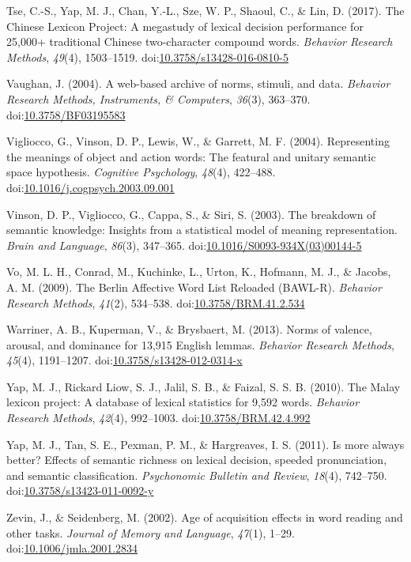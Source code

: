 \documentclass[english,man]{apa6}
\theoremstyle{definition}
\theoremstyle{definition}
\theoremstyle{definition}
\theoremstyle{remark}
\begin{document}
\hypertarget{ref-Tse2017}{}
Tse, C.-S., Yap, M. J., Chan, Y.-L., Sze, W. P., Shaoul, C., \& Lin, D.
(2017). The Chinese Lexicon Project: A megastudy of lexical decision
performance for 25,000+ traditional Chinese two-character compound
words. \emph{Behavior Research Methods}, \emph{49}(4), 1503--1519.
doi:\href{https://doi.org/10.3758/s13428-016-0810-5}{10.3758/s13428-016-0810-5}

\hypertarget{ref-Vaughan2004}{}
Vaughan, J. (2004). A web-based archive of norms, stimuli, and data.
\emph{Behavior Research Methods, Instruments, \& Computers},
\emph{36}(3), 363--370.
doi:\href{https://doi.org/10.3758/BF03195583}{10.3758/BF03195583}

\hypertarget{ref-Vigliocco2004}{}
Vigliocco, G., Vinson, D. P., Lewis, W., \& Garrett, M. F. (2004).
Representing the meanings of object and action words: The featural and
unitary semantic space hypothesis. \emph{Cognitive Psychology},
\emph{48}(4), 422--488.
doi:\href{https://doi.org/10.1016/j.cogpsych.2003.09.001}{10.1016/j.cogpsych.2003.09.001}

\hypertarget{ref-Vinson2003}{}
Vinson, D. P., Vigliocco, G., Cappa, S., \& Siri, S. (2003). The
breakdown of semantic knowledge: Insights from a statistical model of
meaning representation. \emph{Brain and Language}, \emph{86}(3),
347--365.
doi:\href{https://doi.org/10.1016/S0093-934X(03)00144-5}{10.1016/S0093-934X(03)00144-5}

\hypertarget{ref-Vo2009}{}
Vo, M. L. H., Conrad, M., Kuchinke, L., Urton, K., Hofmann, M. J., \&
Jacobs, A. M. (2009). The Berlin Affective Word List Reloaded (BAWL-R).
\emph{Behavior Research Methods}, \emph{41}(2), 534--538.
doi:\href{https://doi.org/10.3758/BRM.41.2.534}{10.3758/BRM.41.2.534}

\hypertarget{ref-Warriner2013}{}
Warriner, A. B., Kuperman, V., \& Brysbaert, M. (2013). Norms of
valence, arousal, and dominance for 13,915 English lemmas.
\emph{Behavior Research Methods}, \emph{45}(4), 1191--1207.
doi:\href{https://doi.org/10.3758/s13428-012-0314-x}{10.3758/s13428-012-0314-x}

\hypertarget{ref-Yap2010}{}
Yap, M. J., Rickard Liow, S. J., Jalil, S. B., \& Faizal, S. S. B.
(2010). The Malay lexicon project: A database of lexical statistics for
9,592 words. \emph{Behavior Research Methods}, \emph{42}(4), 992--1003.
doi:\href{https://doi.org/10.3758/BRM.42.4.992}{10.3758/BRM.42.4.992}

\hypertarget{ref-Yap2011}{}
Yap, M. J., Tan, S. E., Pexman, P. M., \& Hargreaves, I. S. (2011). Is
more always better? Effects of semantic richness on lexical decision,
speeded pronunciation, and semantic classification. \emph{Psychonomic
Bulletin and Review}, \emph{18}(4), 742--750.
doi:\href{https://doi.org/10.3758/s13423-011-0092-y}{10.3758/s13423-011-0092-y}

\hypertarget{ref-Zevin2002}{}
Zevin, J., \& Seidenberg, M. (2002). Age of acquisition effects in word
reading and other tasks. \emph{Journal of Memory and Language},
\emph{47}(1), 1--29.
doi:\href{https://doi.org/10.1006/jmla.2001.2834}{10.1006/jmla.2001.2834}
\end{document}
